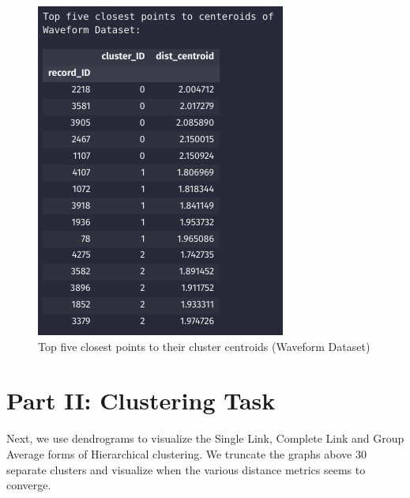 \documentclass{article}
\begin{document}
\begin{figure}[H]
\begin{minipage}[b]{0.47\textwidth}
        \includegraphics[width=\textwidth, height=0.3\textheight]{top_five_waveform.png}
        \caption{Top five closest points to their cluster centroids (Waveform Dataset)}
    \end{minipage}
\end{figure}

\newpage

\section{Part II: Clustering Task}

Next, we use dendrograms to visualize the Single Link, Complete Link and Group Average forms of Hierarchical clustering. We truncate the
graphs above 30 separate clusters and visualize when the various distance metrics seems to converge.
\end{document}
